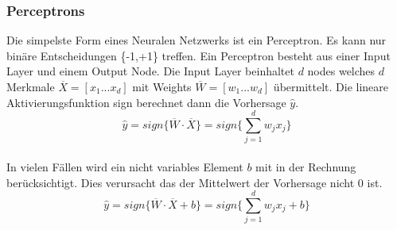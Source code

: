 
\subsubsection{Perceptrons}
Die simpelste Form eines Neuralen Netzwerks ist ein Perceptron. Es kann nur binäre Entscheidungen \{-1,+1\} treffen. Ein Perceptron besteht aus einer Input Layer und einem Output Node.
Die Input Layer beinhaltet $d$ nodes welches $d$ Merkmale $\overline{X} = [x_1...x_d]$ mit Weights $\overline{W} = [w_1...w_d]$ übermittelt. Die lineare Aktivierungsfunktion sign berechnet
dann die Vorhersage $\hat{y}$. \cite{CA18}\\
$$\hat{y} = sign\{\overline{W} \cdot \overline{X}\} = sign\{\sum\limits^{d}_{j=1}w_jx_j\}$$\\
In vielen Fällen wird ein nicht variables Element $b$ mit in der Rechnung berücksichtigt. Dies verursacht das der Mittelwert der Vorhersage nicht 0 ist. \cite{CA18}\\
$$\hat{y} = sign\{\overline{W} \cdot \overline{X} + b\} = sign\{\sum\limits^{d}_{j=1}w_jx_j + b\}$$\\
